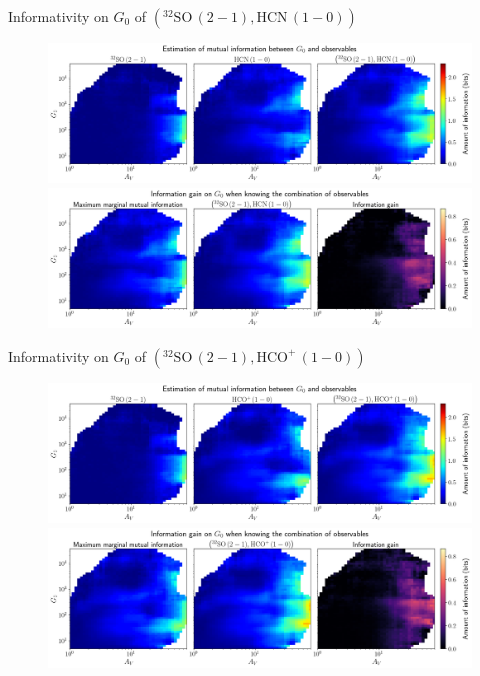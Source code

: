 \documentclass{beamer}
\begin{document}
\begin{frame}{Informativity on $G_0$ of $\left(\mathrm{^{32}SO\,(2-1)},\mathrm{HCN\,(1-0)}\right)$}
    \begin{figure}
        \centering
        \includegraphics[width=0.95\linewidth]{../mi/g0__32so21_hcn10_mi.png}
        \vfill
        \includegraphics[width=0.95\linewidth]{../mi/g0__32so21_hcn10_mi_gain.png}
    \end{figure}
\end{frame}

\begin{frame}{Informativity on $G_0$ of $\left(\mathrm{^{32}SO\,(2-1)},\mathrm{HCO^+\,(1-0)}\right)$}
    \begin{figure}
        \centering
        \includegraphics[width=0.95\linewidth]{../mi/g0__32so21_hcop10_mi.png}
        \vfill
        \includegraphics[width=0.95\linewidth]{../mi/g0__32so21_hcop10_mi_gain.png}
    \end{figure}
\end{frame}
\end{document}
